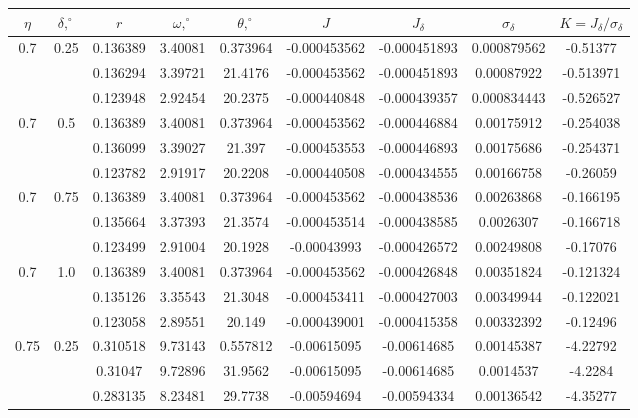 \documentclass[11pt]{article}
\begin{document}
\begin{figure}[h]
\begin{tabular}{|c|c|c|c|c|c|c|c|c|}
\hline
$\eta$ & $\delta,^\circ$ & $r$ & $\omega,^\circ$ & $\theta,^\circ$ & $J$ & $J_{\delta}$ & $\sigma_{\delta}$ & $K = J_{\delta}/\sigma_{\delta}$
\\\hline
\multirow{3}{*}{0.7} & \multirow{3}{*}{0.25} & 0.136389 & 3.40081 & 0.373964 & -0.000453562 & -0.000451893 & 0.000879562 & -0.51377\\\cline{3-9}
 &  & 0.136294 & 3.39721 & 21.4176 & -0.000453562 & -0.000451893 & 0.00087922 & -0.513971\\\cline{3-9}
 &  & 0.123948 & 2.92454 & 20.2375 & -0.000440848 & -0.000439357 & 0.000834443 & -0.526527\\\hline
\multirow{3}{*}{0.7} & \multirow{3}{*}{0.5} & 0.136389 & 3.40081 & 0.373964 & -0.000453562 & -0.000446884 & 0.00175912 & -0.254038\\\cline{3-9}
 &  & 0.136099 & 3.39027 & 21.397 & -0.000453553 & -0.000446893 & 0.00175686 & -0.254371\\\cline{3-9}
 &  & 0.123782 & 2.91917 & 20.2208 & -0.000440508 & -0.000434555 & 0.00166758 & -0.26059\\\hline
\multirow{3}{*}{0.7} & \multirow{3}{*}{0.75} & 0.136389 & 3.40081 & 0.373964 & -0.000453562 & -0.000438536 & 0.00263868 & -0.166195\\\cline{3-9}
 &  & 0.135664 & 3.37393 & 21.3574 & -0.000453514 & -0.000438585 & 0.0026307 & -0.166718\\\cline{3-9}
 &  & 0.123499 & 2.91004 & 20.1928 & -0.00043993 & -0.000426572 & 0.00249808 & -0.17076\\\hline
\multirow{3}{*}{0.7} & \multirow{3}{*}{1.0} & 0.136389 & 3.40081 & 0.373964 & -0.000453562 & -0.000426848 & 0.00351824 & -0.121324\\\cline{3-9}
 &  & 0.135126 & 3.35543 & 21.3048 & -0.000453411 & -0.000427003 & 0.00349944 & -0.122021\\\cline{3-9}
 &  & 0.123058 & 2.89551 & 20.149 & -0.000439001 & -0.000415358 & 0.00332392 & -0.12496\\\hline
\multirow{3}{*}{0.75} & \multirow{3}{*}{0.25} & 0.310518 & 9.73143 & 0.557812 & -0.00615095 & -0.00614685 & 0.00145387 & -4.22792\\\cline{3-9}
 &  & 0.31047 & 9.72896 & 31.9562 & -0.00615095 & -0.00614685 & 0.0014537 & -4.2284\\\cline{3-9}
 &  & 0.283135 & 8.23481 & 29.7738 & -0.00594694 & -0.00594334 & 0.00136542 & -4.35277\\\hline

\end{tabular}
\end{figure}
\end{document}
